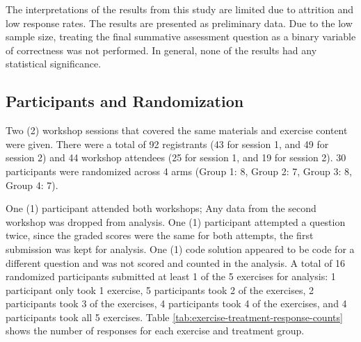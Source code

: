\documentclass[040-assessment.tex]{subfiles}
\begin{document}
The interpretations of the results from this study are limited due to attrition and low response rates.
The results are presented as preliminary data.
Due to the low sample size, treating the final summative assessment question as a binary variable of
correctness was not performed.
In general, none of the results had any statistical significance.

\subsection{Participants and Randomization}

    Two (2) workshop sessions that covered the same materials and exercise content were given.
    There were a total of 92 registrants (43 for session 1, and 49 for session 2)
    and 44 workshop attendees (25 for session 1, and 19 for session 2).
    30 participants were randomized across 4 arms
    (Group 1: 8, Group 2: 7, Group 3: 8, Group 4: 7).

    One (1) participant attended both workshops;
    Any data from the second workshop was dropped from analysis.
    One (1) participant attempted a question twice,
    since the graded scores were the same for both attempts,
    the first submission was kept for analysis.
    One (1) code solution appeared to be code for a different question and was not scored and counted in the analysis.
    A total of 16 randomized participants submitted at least 1 of the 5 exercises for analysis:
    1 participant only took 1 exercise,
    5 participants took 2 of the exercises,
    2 participants took 3 of the exercises,
    4 participants took 4 of the exercises, and
    4 participants took all 5 exercises.
    Table \ref{tab:exercise-treatment-response-counts} shows the number of
    responses for each exercise and treatment group.
\end{document}
